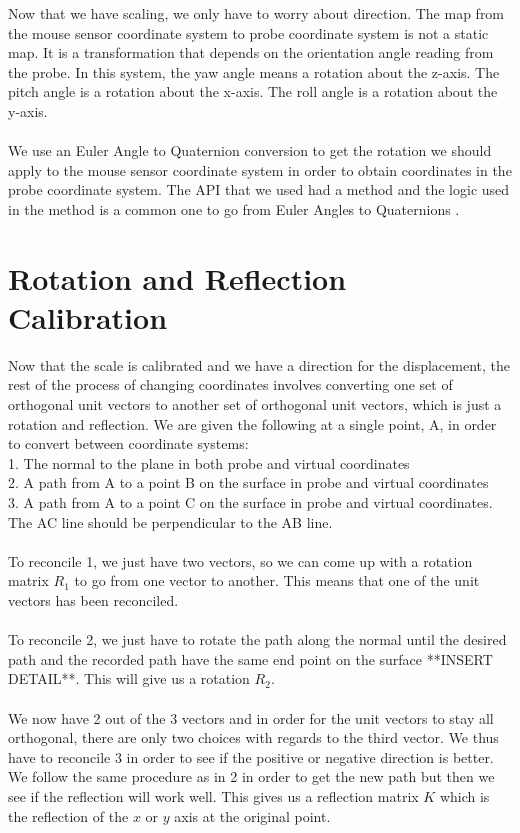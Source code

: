 \documentclass[conference]{acmsiggraph}
\begin{document}
Now that we have scaling, we only have to worry about direction. The map from the mouse sensor coordinate system to probe coordinate system is not a static map. It is a transformation that depends on the orientation angle reading from the probe. In this system, the yaw angle means a rotation about the z-axis. The pitch angle is a rotation about the x-axis. The roll angle is a rotation about the y-axis. \\
\\
We use an Euler Angle to Quaternion conversion to get the rotation we should apply to the mouse sensor coordinate system in order to obtain coordinates in the probe coordinate system. The API that we used had a method \cite{jmonkeyrotation} and the logic used in the method is a common one to go from Euler Angles to Quaternions \cite{quaternionTextboook}.

\section{Rotation and Reflection Calibration}

Now that the scale is calibrated and we have a direction for the displacement, the rest of the process of changing coordinates involves converting one set of orthogonal unit vectors to another set of orthogonal unit vectors, which is just a rotation and reflection. We are given the following at a single point, A, in order to convert between coordinate systems:\\
1. The normal to the plane in both probe and virtual coordinates\\
2. A path from A to a point B on the surface in probe and virtual coordinates\\
3. A path from A to a point C on the surface in probe and virtual coordinates. The AC line should be perpendicular to the AB line. \\
\\
To reconcile 1, we just have two vectors, so we can come up with a rotation matrix $R_1$ to go from one vector to another. This means that one of the unit vectors has been reconciled. \\
\\
To reconcile 2, we just have to rotate the path along the normal until the desired path and the recorded path have the same end point on the surface **INSERT DETAIL**. This will give us a rotation $R_2$. \\
\\
We now have 2 out of the 3 vectors and in order for the unit vectors to stay all orthogonal, there are only two choices with regards to the third vector. We thus have to reconcile 3 in order to see if the positive or negative direction is better. We follow the same procedure as in 2 in order to get the new path but then we see if the reflection will work well. This gives us a reflection matrix $K$ which is the reflection of the $x$ or $y$ axis at the original point.
\end{document}
